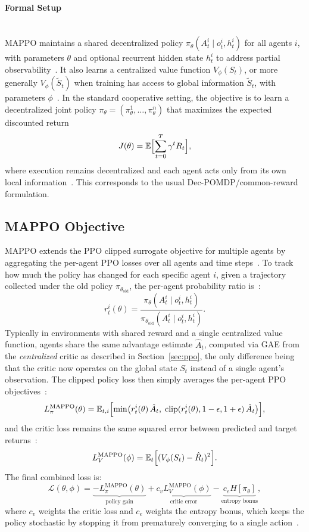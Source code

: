 \paragraph{Formal Setup}\mbox{}\\
MAPPO maintains a shared decentralized policy $\pi_\theta(A_t^i \mid o_t^i, h_t^i)$ for all agents $i$, with parameters $\theta$ and optional recurrent hidden state $h_t^i$ to address partial observability~\cite{yu2021mappo}. It also learns a centralized value function $V_\phi(S_t)$, or more generally $V_\phi(\tilde S_t)$ when training has access to global information $\tilde S_t$, with parameters $\phi$~\cite{yu2021mappo}. In the standard cooperative setting, the objective is to learn a decentralized joint policy $\pi_\theta = (\pi_\theta^1,\dots,\pi_\theta^n)$ that maximizes the expected discounted return
\[
J(\theta)
= \mathbb{E}\Bigl[\sum_{t=0}^{T} \gamma^t R_t \Bigr],
\]
where execution remains decentralized and each agent acts only from its own local information~\cite{yu2021mappo}. This corresponds to the usual Dec-POMDP/common-reward formulation.

\subsection{MAPPO Objective}

MAPPO extends the PPO clipped surrogate objective for multiple agents by aggregating the per-agent PPO losses over all agents and time steps~\cite{yu2021mappo, schulman2017ppo}. To track how much the policy has changed for each specific agent $i$, given a trajectory collected under the old policy $\pi_{\theta_{\text{old}}}$, the per-agent probability ratio is~\cite{yu2021mappo, schulman2017ppo}:
\[
r_t^i(\theta)
= \frac{\pi_\theta(A_t^i \mid o_t^i, h_t^i)}{\pi_{\theta_{\text{old}}}(A_t^i \mid o_t^i, h_t^i)}.
\]
Typically in environments with shared reward and a single centralized value function, agents share the same advantage estimate $\hat{A}_t$, computed via GAE from the \emph{centralized} critic as described in Section~\ref{sec:ppo}, the only difference being that the critic now operates on the global state $S_t$ instead of a single agent's observation. The clipped policy loss then simply averages the per-agent PPO objectives~\cite{yu2021mappo, schulman2017ppo}:
\[
L^{\text{MAPPO}}_{\pi}(\theta)
= \mathbb{E}_{t,i}\Bigl[
\min\bigl(
r_t^i(\theta)\,\hat{A}_t,\;
\operatorname{clip}(r_t^i(\theta), 1-\epsilon, 1+\epsilon)\,\hat{A}_t
\bigr)
\Bigr],
\]
and the critic loss remains the same squared error between predicted and target returns~\cite{yu2021mappo}:
\[
L^{\text{MAPPO}}_{V}(\phi)
= \mathbb{E}_t\Bigl[(V_\phi(S_t) - \hat{R}_t)^2\Bigr].
\]
The final combined loss is:
\[
\mathcal{L}(\theta,\phi)
= \underbrace{- L^{\text{MAPPO}}_{\pi}(\theta)}_{\text{policy gain}}
+ \underbrace{c_v L^{\text{MAPPO}}_{V}(\phi)}_{\text{critic error}}
- \underbrace{c_e H[\pi_\theta]}_{\text{entropy bonus}},
\]
where $c_v$ weights the critic loss and $c_e$ weights the entropy bonus, which keeps the policy stochastic by stopping it from prematurely converging to a single action~\cite{yu2021mappo}.


